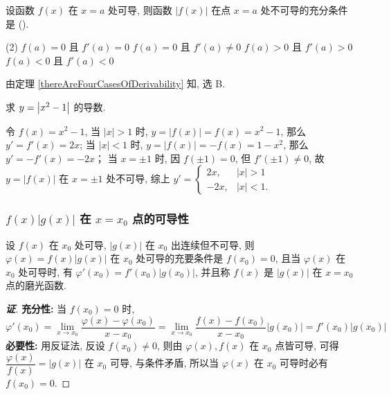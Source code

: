 \begin{example}[2000 数三]
    设函数 $f(x)$ 在 $x=a$ 处可导, 则函数 $|f(x)|$ 在点 $x=a$ 处不可导的充分条件是 (\quad).
    \begin{tasks}(2)
        \task $f(a)=0$ 且 $f'(a)=0$
        \task $f(a)=0$ 且 $f'(a)\not=0$
        \task $f(a)>0$ 且 $f'(a)>0$
        \task $f(a)<0$ 且 $f'(a)<0$
    \end{tasks}
\end{example}
\begin{solution}
    由定理 \ref{thereAreFourCasesOfDerivability} 知, 选 B.
\end{solution}

\begin{example}
    求 $y=\qty|x^2-1|$ 的导数.
\end{example}
\begin{solution}
    令 $f(x)=x^2-1$, 当 $ |x|>1 $ 时, $y=|f(x)|=f(x)=x^2-1$, 那么 $y'=f'(x)=2x$; 当 $|x|<1$ 时, $y=|f(x)|=-f(x)=1-x^2$, 那么 $y'=-f'(x)=-2x$；
    当 $x=\pm 1$ 时, 因 $f(\pm 1)=0$, 但 $f'(\pm 1)\neq0$, 故 $y=|f(x)|$ 在 $x=\pm1$ 处不可导, 综上 $y'=\begin{cases}
        2x,&|x|>1\\-2x,&|x|<1.
    \end{cases}$
\end{solution}

\subsubsection{\texorpdfstring{$f(x)|g(x)|$}. 在 \texorpdfstring{$x=x_0$}. 点的可导性}

\begin{theorem}
    \label{hanshukedaoxing}
    设 $f(x)$ 在 $x_0$ 处可导, $|g(x)|$ 在 $x_0$ 出连续但不可导, 则 $\varphi (x)=f(x)|g(x)|$ 在 $x_0$ 处可导的充要条件是 $f(x_0)=0$, 
    且当 $\varphi(x)$ 在 $x_0$ 处可导时, 有 $\varphi'(x_0)=f'(x_0)|g(x_0)|$, 并且称 $f(x)$ 是 $|g(x)|$ 在 $x=x_0$ 点的磨光函数.
\end{theorem}
\begin{proof}[{\songti \textbf{证}}]
    \textbf{充分性: }当 $f(x_0)=0$ 时, $$ \varphi'(x_0)=\lim_{x\to x_0}\dfrac{\varphi (x)-\varphi(x_0)}{x-x_0}=\lim_{x\to x_0}\dfrac{f(x)-f(x_0)}{x-x_0}|g(x_0)|=f'(x_0)|g(x_0)| $$
    \textbf{必要性: }用反证法, 反设 $f(x_0)\neq 0$, 则由 $\varphi(x),f(x)$ 在 $x_0$ 点皆可导, 可得 $\dfrac{\varphi(x)}{f(x)}=|g(x)|$ 在 $x_0$ 可导, 与条件矛盾, 所以当 $\varphi(x)$ 在 $x_0$ 可导时必有 $f(x_0)=0.$
\end{proof}

